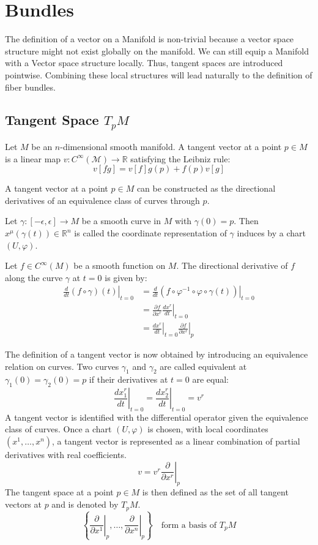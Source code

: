 
\chapter{Bundles}

  The definition of a vector on a Manifold is non-trivial because a vector space structure might not exist globally on the manifold. We can still equip a Manifold with a Vector space structure locally. Thus, tangent spaces are introduced pointwise. Combining these local structures will lead naturally to the definition of fiber bundles.

\section{Tangent Space $T_pM$}

  Let $M$ be an $n$-dimensional smooth manifold. A tangent vector at a point $p \in M$ is a linear map $v: C^\infty(\mathcal{M}) \to \mathbb{R}$ satisfying the Leibniz rule\cite{FredericSchullerDifferentialstructurespivotalconcepttangentvectorspacesLec09FredericSchuller2015}:
 \[ v[fg] = v[f]g(p) + f(p)v[g] \]

  A tangent vector at a point $p \in M$ can be constructed as the directional derivatives of an equivalence class of curves through $p$\cite{NakaharaGeometrytopologyphysics2005}.

  Let $\gamma: [-\epsilon, \epsilon] \to M$ be a smooth curve in $M$ with $\gamma(0)=p$. Then $x^\mu(\gamma(t)) \in \mathbb{R}^n$ is called the coordinate representation of $\gamma$ induces by a chart $(U, \varphi)$.

Let $f \in C^\infty(M)$ be a smooth function on $M$. The directional derivative of $f$ along the curve $\gamma$ at $t=0$ is given by:
\begin{align*}
\left. \frac{d}{dt} (f \circ \gamma)(t) \right|_{t=0}
  &= \left. \frac{d}{dt} \left( f\circ \varphi^{-1}\circ\varphi\circ\gamma(t) \right) \right|_{t=0} \\
&= \left. \frac{\partial f}{\partial x^r} \frac{d x^r}{dt} \right|_{t=0} \\
&= \left. \frac{d x^r}{dt} \right|_{t=0} \left. \frac{\partial f}{\partial x^r} \right|_p
\end{align*}

The definition of a tangent vector is now obtained by introducing an equivalence relation on curves. Two curves $\gamma_1$ and $\gamma_2$ are called equivalent at $\gamma_1(0)=\gamma_2(0)=p$ if their derivatives at $t=0$ are equal:
\[
\left. \frac{d x_1^r}{dt} \right|_{t=0}
= \left. \frac{d x_2^r}{dt} \right|_{t=0}
= v^r
\]
A tangent vector is identified with the differential operator given the equivalence class of curves. Once a chart $(U, \varphi)$ is chosen, with local coordinates $(x^1, \dots, x^n)$, a tangent vector is represented as a linear combination of partial derivatives with real coefficients.
\[
v = v^r \left. \frac{\partial}{\partial x^r} \right|_p
\]
The tangent space at a point $p \in M$ is then defined as the set of all tangent vectors at $p$ and is denoted by $T_pM$.
\[
\left\{ \left. \frac{\partial}{\partial x^1} \right|_p, \dots, \left. \frac{\partial}{\partial x^n} \right|_p \right\} \quad \text{form a basis of } T_pM
\]



